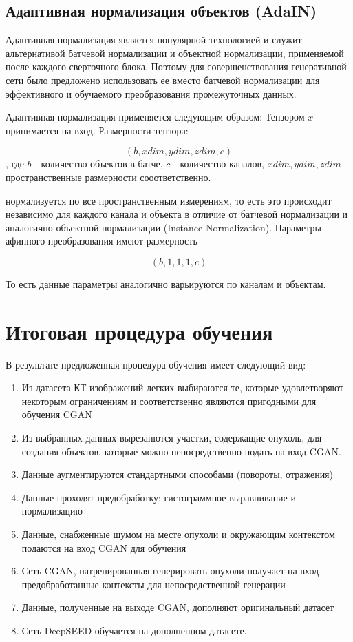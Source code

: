 \subsection{Адаптивная нормализация объектов (AdaIN)}

Адаптивная нормализация является популярной технологией и служит альтернативой батчевой нормализации и объектной нормализации, применяемой после каждого сверточного блока. Поэтому для совершенствования генеративной сети было предложено использовать ее вместо батчевой нормализации для эффективного и обучаемого преобразования промежуточных данных.

Адаптивная нормализация применяется следующим образом: Тензором $x$ принимается на вход. Размерности тензора: 

$$(b, xdim, ydim, zdim, c)$$, где $b$ - количество объектов в батче, $c$ - количество каналов, $xdim, ydim, zdim$ - пространственные размерности сооответственно.

нормализуется по все пространственным измерениям, то есть это происходит независимо для каждого канала и объекта в отличие от батчевой нормализации и аналогично объектной нормализации (Instance Normalization). Параметры афинного преобразования имеют размерность 

$$(b, 1, 1, 1, c)$$

То есть данные параметры аналогично варьируются по каналам и объектам.

\section{Итоговая процедура обучения}

В результате предложенная процедура обучения имеет следующий вид:

\begin{enumerate}
    \item Из датасета КТ изображений легких выбираются те, которые удовлетворяют некоторым ограничениям и соответственно являются пригодными для обучения CGAN
    \item Из выбранных данных вырезанются участки, содержащие опухоль, для создания объектов, которые можно непосредственно подать на вход CGAN.
    \item Данные аугментируются стандартными способами (повороты, отражения)
    \item Данные проходят предобработку: гистограммное выравнивание и нормализацию
    \item Данные, снабженные шумом на месте опухоли и окружающим контекстом подаются на вход CGAN для обучения
    \item Сеть CGAN, натренированная генерировать опухоли получает на вход предобработанные контексты для непосредственной генерации
    \item Данные, полученные на выходе CGAN, дополняют оригинальный датасет
    \item Сеть DeepSEED обучается на дополненном датасете.
\end{enumerate}

